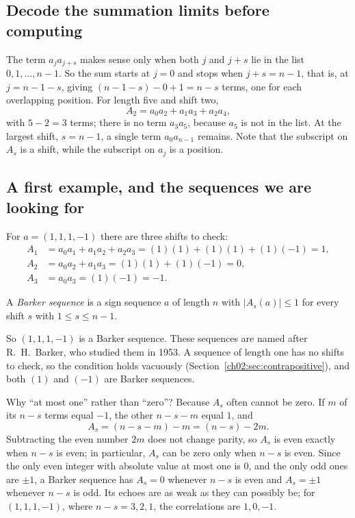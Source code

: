 \subsection*{Decode the summation limits before computing}
The term $a_ja_{j+s}$ makes sense only when both $j$ and $j+s$ lie in the list $0,1,\ldots,n-1$. So the sum starts at $j=0$ and stops when $j+s=n-1$, that is, at $j=n-1-s$, giving $(n-1-s)-0+1=n-s$ terms, one for each overlapping position. For length five and shift two,
\[
 A_2=a_0a_2+a_1a_3+a_2a_4,
\]
with $5-2=3$ terms; there is no term $a_3a_5$, because $a_5$ is not in the list. At the largest shift, $s=n-1$, a single term $a_0a_{n-1}$ remains. Note that the subscript on $A_s$ is a shift, while the subscript on $a_j$ is a position.

\subsection*{A first example, and the sequences we are looking for}
For $a=(1,1,1,-1)$ there are three shifts to check:
\begin{align*}
A_1&=a_0a_1+a_1a_2+a_2a_3=(1)(1)+(1)(1)+(1)(-1)=1,\\
A_2&=a_0a_2+a_1a_3=(1)(1)+(1)(-1)=0,\\
A_3&=a_0a_3=(1)(-1)=-1.
\end{align*}

\par\noindent\begin{minipage}{\linewidth}
\begin{definition}\label{ch14:def:barker}
A \emph{Barker sequence} is a sign sequence $a$ of length $n$ with $|A_s(a)|\le1$ for every shift $s$ with $1\le s\le n-1$.
\end{definition}
\end{minipage}\par

So $(1,1,1,-1)$ is a Barker sequence. These sequences are named after R.~H.~Barker, who studied them in 1953. A sequence of length one has no shifts to check, so the condition holds vacuously (Section~\ref{ch02:sec:contrapositive}), and both $(1)$ and $(-1)$ are Barker sequences.

Why ``at most one'' rather than ``zero''? Because $A_s$ often cannot be zero. If $m$ of its $n-s$ terms equal $-1$, the other $n-s-m$ equal $1$, and
\[
A_s=(n-s-m)-m=(n-s)-2m.
\]
Subtracting the even number $2m$ does not change parity, so $A_s$ is even exactly when $n-s$ is even; in particular, $A_s$ can be zero only when $n-s$ is even. Since the only even integer with absolute value at most one is $0$, and the only odd ones are $\pm1$, a Barker sequence has $A_s=0$ whenever $n-s$ is even and $A_s=\pm1$ whenever $n-s$ is odd. Its echoes are as weak as they can possibly be; for $(1,1,1,-1)$, where $n-s=3,2,1$, the correlations are $1,0,-1$.

